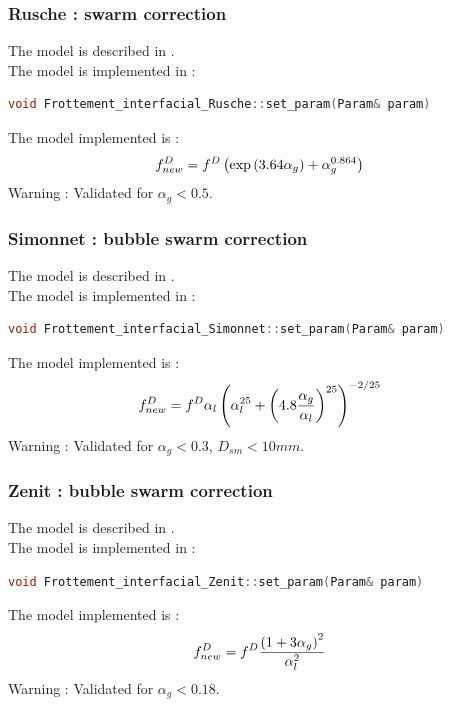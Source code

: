 \subsubsection{Rusche : swarm correction}
The model is described in \cite{Rusche}.\\
The model is implemented in :
\begin{lstlisting}[language=c++]
void Frottement_interfacial_Rusche::set_param(Param& param)
\end{lstlisting}
The model implemented is :
\begin{equation}
   f^{D}_{new}=f^{D}\left( \exp\left( 3.64\alpha_g \right)+\alpha_g^{0.864} \right)
\end{equation}
{\color{red} Warning} : Validated for $\alpha_g  < 0.5$.

\subsubsection{Simonnet : bubble swarm correction}
The model is described in \cite{SIMONNET2007858}.\\
The model is implemented in :
\begin{lstlisting}[language=c++]
void Frottement_interfacial_Simonnet::set_param(Param& param)
\end{lstlisting}
The model implemented is :
\begin{equation}
   f^{D}_{new}=f^{D}\alpha_l\left( \alpha_l^{25} + \left( 4.8\frac{\alpha_g}{\alpha_l} \right)^{25} \right)^{-2/25}
\end{equation}
{\color{red} Warning} : Validated for $\alpha_g  < 0.3$, $D_{sm} < 10 mm$.

\subsubsection{Zenit : bubble swarm correction}
The model is described in \cite{zenit}.\\
The model is implemented in :
\begin{lstlisting}[language=c++]
void Frottement_interfacial_Zenit::set_param(Param& param)
\end{lstlisting}
The model implemented is :
\begin{equation}
   f^{D}_{new}=f^{D}\frac{\left( 1+3\alpha_g \right)^2}{\alpha_l^2}
\end{equation}
{\color{red} Warning} : Validated for  $\alpha_g  < 0.18$.

